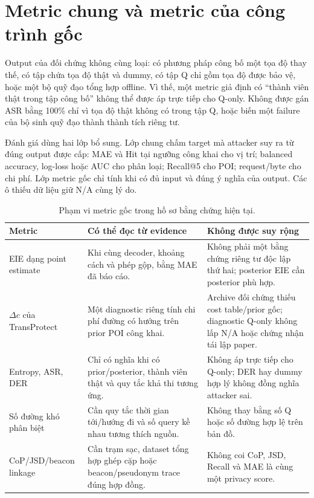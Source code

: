 \section{Metric chung và metric của công trình gốc}
\label{sec:current-metric-fairness}

Output của đối chứng không cùng loại: có phương pháp công bố một tọa độ thay
thế, có tập chứa tọa độ thật và dummy, có tập Q chỉ gồm tọa độ được bảo vệ,
hoặc một bộ quỹ đạo tổng hợp offline. Vì thế, một metric giả định có ``thành
viên thật trong tập công bố'' không thể được áp trực tiếp cho Q-only. Không
được gán ASR bằng 100\% chỉ vì tọa độ thật không có trong tập Q, hoặc biến một
failure của bộ sinh quỹ đạo thành thành tích riêng tư.

Đánh giá dùng hai lớp bổ sung. Lớp chung chấm target mà attacker suy ra từ
đúng output được cấp: MAE và Hit tại ngưỡng công khai cho vị trí; balanced
accuracy, log-loss hoặc AUC cho phân loại; Recall@5 cho POI; request/byte cho
chi phí. Lớp metric gốc chỉ tính khi có đủ input và đúng ý nghĩa của output.
Các ô thiếu dữ liệu giữ N/A cùng lý do.

\begin{table}[htbp]
\centering\small
\caption{Phạm vi metric gốc trong hồ sơ bằng chứng hiện tại.}
\label{tab:current-native-metrics}
\begin{tabularx}{\textwidth}{P{3.0cm}Y Y}
\toprule Metric & Có thể đọc từ evidence & Không được suy rộng \\\midrule
EIE dạng point estimate & Khi cùng decoder, khoảng cách và phép gộp, bằng MAE đã báo cáo. & Không phải một bằng chứng riêng tư độc lập thứ hai; posterior EIE cần posterior phù hợp. \\
$\Delta c$ của TransProtect & Một diagnostic riêng tính chi phí đường có hướng trên prior POI công khai. & Archive đối chứng thiếu cost table/prior gốc; diagnostic Q-only không lấp N/A hoặc chứng nhận tái lập paper. \\
Entropy, ASR, DER & Chỉ có nghĩa khi có prior/posterior, thành viên thật và quy tắc khả thi tương ứng. & Không áp trực tiếp cho Q-only; DER hay dummy hợp lý không đồng nghĩa attacker sai. \\
Số đường khó phân biệt & Cần quy tắc thời gian tới/hướng đi và số query kề nhau tương thích nguồn. & Không thay bằng số Q hoặc số đường hợp lệ trên bản đồ. \\
CoP/JSD/beacon linkage & Cần trạm sạc, dataset tổng hợp ghép cặp hoặc beacon/pseudonym trace đúng hợp đồng. & Không coi CoP, JSD, Recall và MAE là cùng một privacy score. \\
\bottomrule
\end{tabularx}
\end{table}

